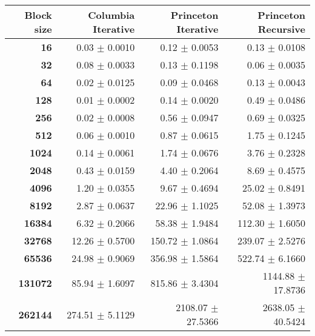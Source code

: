 \begin{tabular}{rrrr}\toprule
\textbf{Block size}  & \textbf{Columbia Iterative} & \textbf{Princeton Iterative} & \textbf{Princeton Recursive}\\\midrule
\textbf{16}  & 0.03 $\pm$ 0.0010 & 0.12 $\pm$ 0.0053 & 0.13 $\pm$ 0.0108\\
\textbf{32}  & 0.08 $\pm$ 0.0033 & 0.13 $\pm$ 0.1198 & 0.06 $\pm$ 0.0035\\
\textbf{64}  & 0.02 $\pm$ 0.0125 & 0.09 $\pm$ 0.0468 & 0.13 $\pm$ 0.0043\\
\textbf{128}  & 0.01 $\pm$ 0.0002 & 0.14 $\pm$ 0.0020 & 0.49 $\pm$ 0.0486\\
\textbf{256}  & 0.02 $\pm$ 0.0008 & 0.56 $\pm$ 0.0947 & 0.69 $\pm$ 0.0325\\
\textbf{512}  & 0.06 $\pm$ 0.0010 & 0.87 $\pm$ 0.0615 & 1.75 $\pm$ 0.1245\\
\textbf{1024}  & 0.14 $\pm$ 0.0061 & 1.74 $\pm$ 0.0676 & 3.76 $\pm$ 0.2328\\
\textbf{2048}  & 0.43 $\pm$ 0.0159 & 4.40 $\pm$ 0.2064 & 8.69 $\pm$ 0.4575\\
\textbf{4096}  & 1.20 $\pm$ 0.0355 & 9.67 $\pm$ 0.4694 & 25.02 $\pm$ 0.8491\\
\textbf{8192}  & 2.87 $\pm$ 0.0637 & 22.96 $\pm$ 1.1025 & 52.08 $\pm$ 1.3973\\
\textbf{16384}  & 6.32 $\pm$ 0.2066 & 58.38 $\pm$ 1.9484 & 112.30 $\pm$ 1.6050\\
\textbf{32768}  & 12.26 $\pm$ 0.5700 & 150.72 $\pm$ 1.0864 & 239.07 $\pm$ 2.5276\\
\textbf{65536}  & 24.98 $\pm$ 0.9069 & 356.98 $\pm$ 1.5864 & 522.74 $\pm$ 6.1660\\
\textbf{131072}  & 85.94 $\pm$ 1.6097 & 815.86 $\pm$ 3.4304 & 1144.88 $\pm$ 17.8736\\
\textbf{262144} & 274.51 $\pm$ 5.1129 & 2108.07 $\pm$ 27.5366 & 2638.05 $\pm$ 40.5424\\
\bottomrule
\end{tabular}
